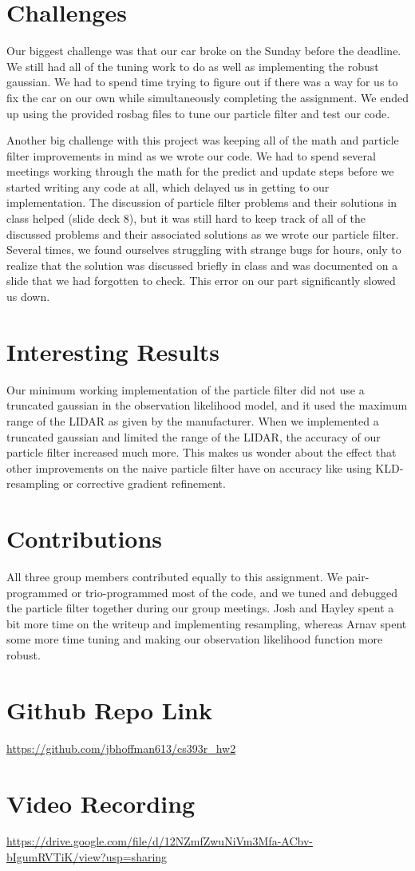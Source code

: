 \section{Challenges}

Our biggest challenge was that our car broke on the Sunday before the deadline. We still had all of the tuning work to do as well as implementing the robust gaussian. We had to spend time trying to figure out if there was a way for us to fix the car on our own while simultaneously completing the assignment. We ended up using the provided rosbag files to tune our particle filter and test our code.

Another big challenge with this project was keeping all of the math and particle filter improvements in mind as we wrote our code. We had to spend several meetings working through the math for the predict and update steps before we started writing any code at all, which delayed us in getting to our implementation. The discussion of particle filter problems and their solutions in class helped (slide deck 8), but it was still hard to keep track of all of the discussed problems and their associated solutions as we wrote our particle filter. Several times, we found ourselves struggling with strange bugs for hours, only to realize that the solution was discussed briefly in class and was documented on a slide that we had forgotten to check. This error on our part significantly slowed us down. 

\section{Interesting Results}
Our minimum working implementation of the particle filter did not use a truncated gaussian in the observation likelihood model, and it used the maximum range of the LIDAR as given by the manufacturer. When we implemented a truncated gaussian and limited the range of the LIDAR, the accuracy of our particle filter increased much more. This makes us wonder about the effect that other improvements on the naive particle filter have on accuracy like using KLD-resampling or corrective gradient refinement. 

\section{Contributions}

All three group members contributed equally to this assignment. We pair-programmed or trio-programmed most of the code, and we tuned and debugged the particle filter together during our group meetings. Josh and Hayley spent a bit more time on the writeup and implementing resampling, whereas Arnav spent some more time tuning and making our observation likelihood function more robust.

\section{Github Repo Link}

\url{https://github.com/jbhoffman613/cs393r_hw2}

\section{Video Recording}

\url{https://drive.google.com/file/d/12NZmfZwuNiVm3Mfa-ACbv-bIgumRVTiK/view?usp=sharing}